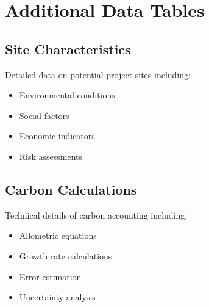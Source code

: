 \documentclass{article}
\theoremstyle{plain}
\theoremstyle{definition}
\theoremstyle{remark}
\begin{document}
\section{Additional Data Tables}

\subsection{Site Characteristics}
Detailed data on potential project sites including:
\begin{itemize}
\item Environmental conditions
\item Social factors
\item Economic indicators
\item Risk assessments
\end{itemize}

\subsection{Carbon Calculations}
Technical details of carbon accounting including:
\begin{itemize}
\item Allometric equations
\item Growth rate calculations
\item Error estimation
\item Uncertainty analysis
\end{itemize}
\end{document}
